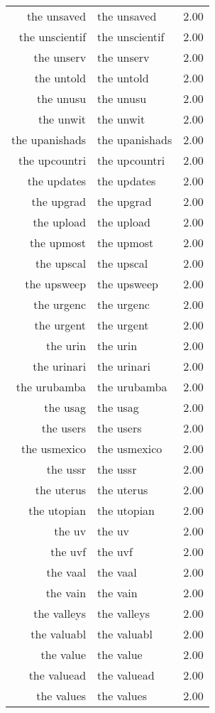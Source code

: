 \begin{table}[ht]
\begin{tabular}{rlr}
  the unsaved & the unsaved & 2.00 \\ 
  the unscientif & the unscientif & 2.00 \\ 
  the unserv & the unserv & 2.00 \\ 
  the untold & the untold & 2.00 \\ 
  the unusu & the unusu & 2.00 \\ 
  the unwit & the unwit & 2.00 \\ 
  the upanishads & the upanishads & 2.00 \\ 
  the upcountri & the upcountri & 2.00 \\ 
  the updates & the updates & 2.00 \\ 
  the upgrad & the upgrad & 2.00 \\ 
  the upload & the upload & 2.00 \\ 
  the upmost & the upmost & 2.00 \\ 
  the upscal & the upscal & 2.00 \\ 
  the upsweep & the upsweep & 2.00 \\ 
  the urgenc & the urgenc & 2.00 \\ 
  the urgent & the urgent & 2.00 \\ 
  the urin & the urin & 2.00 \\ 
  the urinari & the urinari & 2.00 \\ 
  the urubamba & the urubamba & 2.00 \\ 
  the usag & the usag & 2.00 \\ 
  the users & the users & 2.00 \\ 
  the usmexico & the usmexico & 2.00 \\ 
  the ussr & the ussr & 2.00 \\ 
  the uterus & the uterus & 2.00 \\ 
  the utopian & the utopian & 2.00 \\ 
  the uv & the uv & 2.00 \\ 
  the uvf & the uvf & 2.00 \\ 
  the vaal & the vaal & 2.00 \\ 
  the vain & the vain & 2.00 \\ 
  the valleys & the valleys & 2.00 \\ 
  the valuabl & the valuabl & 2.00 \\ 
  the value & the value & 2.00 \\ 
  the valuead & the valuead & 2.00 \\ 
  the values & the values & 2.00 \\ 

\end{tabular}
\end{table}

